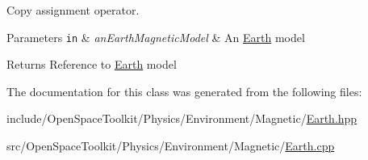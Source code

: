 Copy assignment operator. 


\begin{DoxyParams}[1]{Parameters}
\mbox{\tt in}  & {\em an\+Earth\+Magnetic\+Model} & An \hyperlink{classostk_1_1physics_1_1environment_1_1magnetic_1_1_earth}{Earth} model \\
\hline
\end{DoxyParams}
\begin{DoxyReturn}{Returns}
Reference to \hyperlink{classostk_1_1physics_1_1environment_1_1magnetic_1_1_earth}{Earth} model 
\end{DoxyReturn}


The documentation for this class was generated from the following files\+:\begin{DoxyCompactItemize}
\item 
include/\+Open\+Space\+Toolkit/\+Physics/\+Environment/\+Magnetic/\hyperlink{_magnetic_2_earth_8hpp}{Earth.\+hpp}\item 
src/\+Open\+Space\+Toolkit/\+Physics/\+Environment/\+Magnetic/\hyperlink{_magnetic_2_earth_8cpp}{Earth.\+cpp}\end{DoxyCompactItemize}
